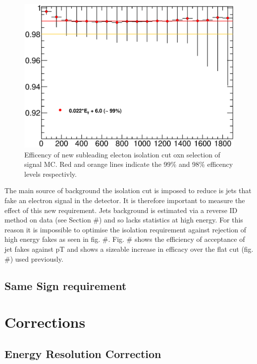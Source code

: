    \begin{figure}[h]
      \begin{center}
      \includegraphics[scale=0.6]{images/C5_sub_iso_efficiency.eps}
      \end{center}
   \caption{Efficency of new subleading electon isolation cut oxn selection of signal MC. Red and orange lines indicate the 99\% and 98\% efficency levels respectivly.}
   \label{fig:C5_sub_iso_efficiency}
   \end{figure}

The main source of background the isolation cut is imposed to reduce is jets that fake an electron signal in the detector. It is therefore important to measure the effect of this new requirement. Jets background is estimated via a reverse ID method on data (see Section \#) and so lacks statistics at high energy. For this reason it is impossible to optimise the isolation requirement against rejection of high energy fakes as seen in fig. \#. Fig. \# shows the efficiency of acceptance of jet fakes against pT and shows a sizeable increase in efficacy over the flat cut (fig. \#) used previously. 




\subsection{Same Sign requirement}




\section{Corrections}

\subsection{Energy Resolution Correction}





\newpage
